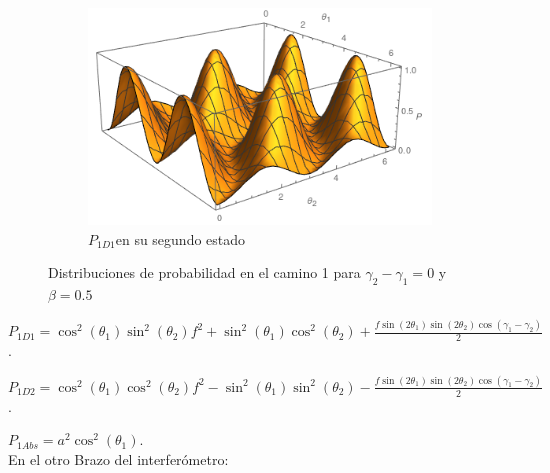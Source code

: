 \documentclass[11pt]{article}
\begin{document}
\begin{figure}[h!]
\begin{subfigure}[b]{0.40\linewidth}
\label{fig:westminster_aerea}
\end{subfigure}
\begin{subfigure}[b]{0.40\linewidth}
\includegraphics[width=\linewidth,height=3.5 cm]{p1cd12.png}
\caption{$P_{1D1} $en su segundo estado }
\label{fig:BS1}
\end{subfigure}
\caption{Distribuciones de probabilidad en el camino 1 para  $\gamma_{2}-\gamma_{1}=0 $ y $\beta=0.5$}
\label{fig:westminster}
\end{figure}

\vspace{5cm}

$P_{1D1}=\cos^2(\theta_{1})\sin^2(\theta_{2})f^2+ \sin^2(\theta_{1})\cos^2(\theta_{2})+\frac{f \sin(2\theta_{1})\sin(2\theta_{2})\cos(\gamma_{1}-\gamma_{2})}{2}$.

$P_{1D2}=\cos^2(\theta_{1})\cos^2(\theta_{2})f^2- \sin^2(\theta_{1})\sin^2(\theta_{2})-\frac{f \sin(2\theta_{1})\sin(2\theta_{2})\cos(\gamma_{1}-\gamma_{2})}{2}$.

$P_{1Abs}=a^2 \cos^2(\theta_{1})$.\\



En el otro Brazo del interferómetro:
\end{document}
